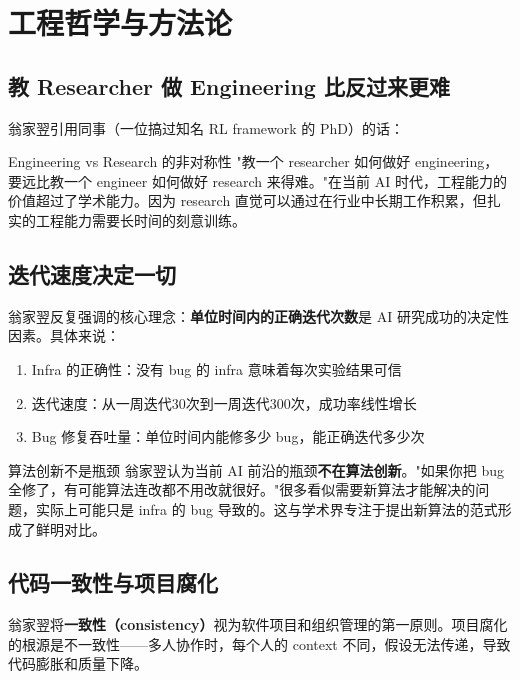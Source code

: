\section{工程哲学与方法论}

\subsection{教 Researcher 做 Engineering 比反过来更难}

翁家翌引用同事（一位搞过知名 RL framework 的 PhD）的话：

\begin{importantbox}{Engineering vs Research 的非对称性}
"教一个 researcher 如何做好 engineering，要远比教一个 engineer 如何做好 research 来得难。"在当前 AI 时代，工程能力的价值超过了学术能力。因为 research 直觉可以通过在行业中长期工作积累，但扎实的工程能力需要长时间的刻意训练。
\end{importantbox}

\subsection{迭代速度决定一切}

翁家翌反复强调的核心理念：\textbf{单位时间内的正确迭代次数}是 AI 研究成功的决定性因素。具体来说：

\begin{enumerate}
    \item Infra 的正确性：没有 bug 的 infra 意味着每次实验结果可信
    \item 迭代速度：从一周迭代30次到一周迭代300次，成功率线性增长
    \item Bug 修复吞吐量：单位时间内能修多少 bug，能正确迭代多少次
\end{enumerate}

\begin{warningbox}{算法创新不是瓶颈}
翁家翌认为当前 AI 前沿的瓶颈\textbf{不在算法创新}。"如果你把 bug 全修了，有可能算法连改都不用改就很好。"很多看似需要新算法才能解决的问题，实际上可能只是 infra 的 bug 导致的。这与学术界专注于提出新算法的范式形成了鲜明对比。
\end{warningbox}

\subsection{代码一致性与项目腐化}

翁家翌将\textbf{一致性（consistency）}视为软件项目和组织管理的第一原则。项目腐化的根源是不一致性——多人协作时，每个人的 context 不同，假设无法传递，导致代码膨胀和质量下降。

